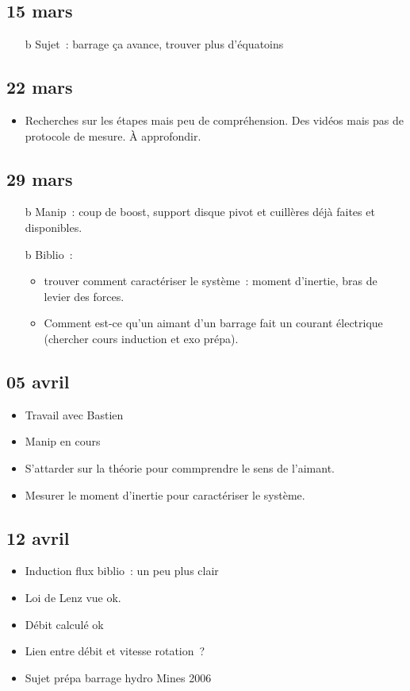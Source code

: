 \documentclass[a4paper, 11pt, final, garamond]{book}
\begin{document}
\subsection{15 mars}
\begin{itemize}
	\item[b]{Sujet}~: barrage ça avance, trouver plus d'équatoins
\end{itemize}

\subsection{22 mars}
\begin{itemize}
	\item Recherches sur les étapes mais peu de compréhension. Des vidéos mais pas
	      de protocole de mesure. À approfondir.
\end{itemize}

\subsection{29 mars}
\begin{itemize}
	\item[b]{Manip}~: coup de boost, support disque pivot et cuillères déjà faites
	et disponibles.
	\item[b]{Biblio}~:
	\begin{itemize}
		\item trouver comment caractériser le système~: moment d'inertie,
		      bras de levier des forces.
		\item Comment est-ce qu'un aimant d'un barrage fait un courant électrique
		      (chercher cours induction et exo prépa).
	\end{itemize}
\end{itemize}

\subsection{05 avril}
\begin{itemize}
	\item Travail avec Bastien
	\item Manip en cours
	\item S'attarder sur la théorie pour commprendre le sens de l'aimant.
	\item Mesurer le moment d'inertie pour caractériser le système.
\end{itemize}

\subsection{12 avril}
\begin{itemize}
	\item Induction flux biblio~: un peu plus clair
	\item Loi de Lenz vue ok.
	\item Débit calculé ok
	\item Lien entre débit et vitesse rotation~?
	\item Sujet prépa barrage hydro Mines 2006
\end{itemize}
\end{document}
